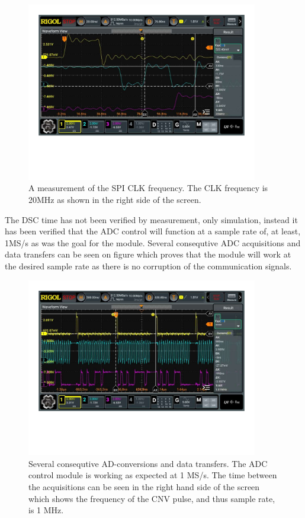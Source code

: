 \begin{figure}[H]
    \centering
    \includegraphics[clip, trim=0 150 0 0, width=0.9\textwidth]{Sections/7_SystemDesign/Figures/7_2_8_ADC_CONTROL_SPICLK.pdf}
    \caption{A measurement of the SPI CLK frequency. The CLK frequency is 20MHz as shown in the right side of the screen.}
    \label{fig:7_2_8_ADC_CONTROL_SPI_CLK}
\end{figure}

The DSC time has not been verified by measurement, only simulation, instead it has been verified that the ADC control will function at a sample rate of, at least, 1MS/s as was the goal for the module. Several consequtive ADC acquisitions and data transfers can be seen on figure  which proves that the module will work at the desired sample rate as there is no corruption of the communication signals.

\begin{figure}[H]
    \centering
    \includegraphics[clip, trim=0 150 0 0, width=0.9\textwidth]{Sections/7_SystemDesign/Figures/7_2_8_ADC_CONTROL_1MEGSAMPLE_MEAS.pdf}
    \caption{Several consequtive AD-conversions and data transfers. The ADC control module is working as expected at 1 MS/s. The time between the acquisitions can be seen in the right hand side of the screen which shows the frequency of the CNV pulse, and thus sample rate, is 1 MHz.}
    \label{fig:7_2_8_ADC_CONTROL_1MEGASAMPLE}
\end{figure}

